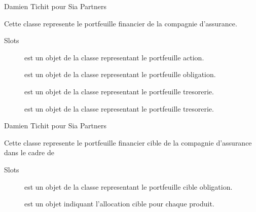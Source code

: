 \documentclass[a4paper]{book}
\begin{document}
%
\begin{Author}\relax
Damien Tichit pour Sia Partners
\end{Author}
%
\begin{Description}\relax
Cette classe represente le portfeuille financier de la compagnie d'assurance.
\end{Description}
%
\begin{Section}{Slots}

\begin{description}

\item[] est un objet de la classe  representant le portfeuille action.

\item[] est un objet de la classe  representant le portfeuille obligation.

\item[] est un objet de la classe  representant le portfeuille tresorerie.

\item[] est un objet de la classe  representant le portfeuille tresorerie.

\end{description}
\end{Section}
%
\begin{Author}\relax
Damien Tichit pour Sia Partners
\end{Author}
%
\begin{Description}\relax
Cette classe represente le portfeuille financier cible de la compagnie d'assurance dans le cadre de
\end{Description}
%
\begin{Section}{Slots}

\begin{description}

\item[] est un objet de la classe  representant le portfeuille cible obligation.

\item[] est un objet  indiquant l'allocation cible pour chaque produit.

\end{description}
\end{Section}
\end{document}
